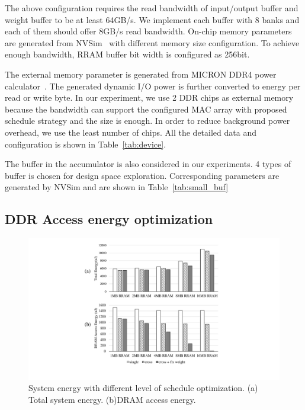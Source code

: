 \documentclass[10pt, conference]{IEEEtran}
\begin{document}
    The above configuration requires the read bandwidth of input/output buffer and weight buffer to be at least 64GB/s. We implement each buffer with 8 banks and each of them should offer 8GB/s read bandwidth. On-chip memory parameters are generated from NVSim~\cite{dong2014nvsim} with different memory size configuration. To achieve enough bandwidth, RRAM buffer bit width is configured as 256bit. 
    
    The external memory parameter is generated from MICRON DDR4 power calculator~\cite{powercalc}. The generated dynamic I/O power is further converted to energy per read or write byte. In our experiment, we use 2 DDR chips as external memory because the bandwidth can support the configured MAC array with proposed schedule strategy and the size is enough. In order to reduce background power overhead, we use the least number of chips. All the detailed data and configuration is shown in Table~\ref{tab:device}. 
    
    The buffer in the accumulator is also considered in our experiments. 4 types of buffer is chosen for design space exploration. Corresponding parameters are generated by NVSim and are shown in Table~\ref{tab:small_buf}
    
    
    
    \subsection{DDR Access energy optimization}
    
    \begin{figure}[t]
      \centering
      \includegraphics[width=1\columnwidth]{fig/opt_res.pdf}
      \caption{System energy with different level of schedule optimization. (a) Total system energy. (b)DRAM access energy.}
      \label{fig:exp_strategy}
    \end{figure}
    
\end{document}
